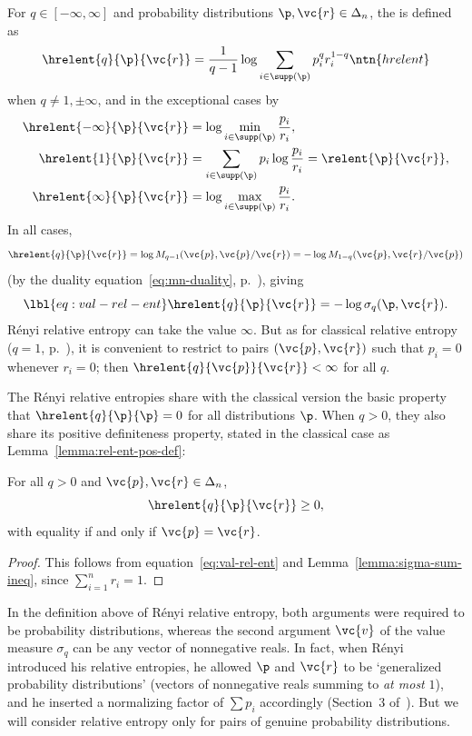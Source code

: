 For $q \in [-\infty, \infty]$ and probability
distributions $\p, \vc{r} \in \Delta_n$, the %
%
%
% 
is defined as 
\[
\hrelent{q}{\p}{\vc{r}}
=
\frac{1}{q - 1} \log \sum_{i \in \supp(\p)} p_i^q r_i^{1 - q}
\ntn{hrelent}
\]
when $q \neq 1, \pm \infty$, and in the exceptional cases by
% 
\begin{align*}
\hrelent{-\infty}{\p}{\vc{r}}   &
=
\log\min_{i \in \supp(\p)} \frac{p_i}{r_i},    \\
\hrelent{1}{\p}{\vc{r}} &
=
\sum_{i \in \supp(\p)} p_i \log \frac{p_i}{r_i}
=
\relent{\p}{\vc{r}},    \\
\hrelent{\infty}{\p}{\vc{r}}    &
=
\log\max_{i \in \supp(\p)} \frac{p_i}{r_i}.
\end{align*}
% 
In all cases, 
\[
\hrelent{q}{\p}{\vc{r}} 
= 
\log M_{q - 1}(\vc{p}, \vc{p}/\vc{r})
=
-\log M_{1 - q}(\vc{p}, \vc{r}/\vc{p})
\]
(by the duality equation~\eqref{eq:mn-duality},
p.~\pageref{eq:mn-duality}), giving
% 
\begin{equation}
\lbl{eq:val-rel-ent}
\hrelent{q}{\p}{\vc{r}}
=
-\log \sigma_q(\p, \vc{r}).
\end{equation}
% 
R\'enyi relative entropy can take the value $\infty$.  But as for classical
relative entropy ($q = 1$, p.~\pageref{p:An}), it is convenient to restrict
to pairs $(\vc{p}, \vc{r})$ such that $p_i = 0$ whenever $r_i = 0$; then
$\hrelent{q}{\vc{p}}{\vc{r}} < \infty$ for all $q$.

The R\'enyi relative entropies share with the classical version the basic
property that $\hrelent{q}{\p}{\p} = 0$ for all distributions $\p$.
When $q > 0$, they also share its positive definiteness property,
stated in the classical case as Lemma~\ref{lemma:rel-ent-pos-def}: 

\begin{lemma}
For all $q > 0$ and $\vc{p}, \vc{r} \in \Delta_n$,
\[
\hrelent{q}{\p}{\vc{r}} \geq 0,
\]
with equality if and only if $\vc{p} = \vc{r}$.
\end{lemma}

\begin{proof}
This follows from equation~\eqref{eq:val-rel-ent} and
Lemma~\ref{lemma:sigma-sum-ineq}, since $\sum_{i = 1}^n r_i = 1$.
\end{proof}

In the definition above of R\'enyi relative entropy, both arguments were
required to be probability distributions, whereas the second argument
$\vc{v}$ of the value measure $\sigma_q$ can be any vector of nonnegative
reals.  In fact, when R\'enyi introduced his relative entropies, he allowed
$\p$ and $\vc{r}$ to be `generalized%
%
%
%
probability distributions' (vectors of nonnegative reals summing to
\emph{at most} $1$), and he inserted a normalizing factor of $\sum p_i$
accordingly (Section~3 of~\cite{Reny}).  But we will consider relative
entropy only for pairs of genuine probability distributions.

